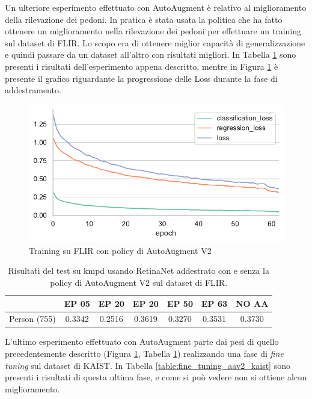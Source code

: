 Un ulteriore esperimento effettuato con AutoAugment è relativo al miglioramento della rilevazione dei pedoni. In pratica è stata usata la politica che ha fatto ottenere un miglioramento nella rilevazione dei pedoni per effettuare un training sul dataset di FLIR. Lo scopo era di ottenere miglior capacità di generalizzazione e quindi passare da un dataset all'altro con risultati migliori. In Tabella \ref{table:tl_flir_kaist_aav2} sono presenti i risultati dell'esperimento appena descritto, mentre in Figura \ref{fig:AA_v2} è presente il grafico riguardante la progressione delle Loss durante la fase di addestramento. 
\begin{figure}[]
    \centering
    \includegraphics[width=\textwidth]{images/graphic/train_aa_flir_v2.pdf}
    \caption{Training su FLIR con policy di AutoAugment V2}
    \label{fig:AA_v2}
\end{figure}

\begin{table}[]
    \begin{tabular}{c|c|c|c|c|c|c|}
    \cline{2-7}
     & EP 05 & EP 20 & EP 20 & EP 50 & EP 63 & NO AA\\ \hline
    \multicolumn{1}{|c|}{Person (755)} & 0.3342 & 0.2516 & 0.3619 & 0.3270 & 0.3531 & 0.3730 \\ \hline
    \end{tabular}
    \caption{Risultati del test su \ac{kmpd} usando RetinaNet addestrato con e senza la policy di AutoAugment V2 sul dataset di FLIR.}
    \label{table:tl_flir_kaist_aav2}
\end{table}

L'ultimo esperimento effettuato con AutoAugment parte dai pesi di quello precedentemente descritto (Figura \ref{fig:AA_v2}, Tabella \ref{table:tl_flir_kaist_aav2}) realizzando una fase di \textit{fine tuning} sul dataset di KAIST. In Tabella \ref{table:fine_tuning_aav2_kaist} sono presenti i risultati di questa ultima fase, e come si può vedere non si ottiene alcun miglioramento. 


